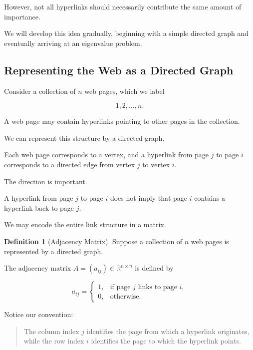 \documentclass[11pt,a4paper]{article}
\theoremstyle{definition}
\newtheorem{definition}[theorem]{Definition}
\theoremstyle{remark}
\begin{document}
However, not all hyperlinks
should necessarily contribute
the same amount of importance.

We will develop this idea
gradually, beginning with
a simple directed graph
and eventually arriving at
an eigenvalue problem.


\subsection{Representing the Web as a Directed Graph}

Consider a collection of
$n$ web pages, which we label

\[
1,2,\ldots,n.
\]

A web page may contain
hyperlinks pointing to
other pages in the collection.

We can represent this
structure by a directed graph.

Each web page corresponds
to a vertex, and a hyperlink
from page $j$ to page $i$
corresponds to a directed
edge from vertex $j$
to vertex $i$.

The direction is important.

A hyperlink from page $j$
to page $i$ does not imply
that page $i$ contains a
hyperlink back to page $j$.

We may encode the entire
link structure in a matrix.

\begin{definition}[Adjacency Matrix]

Suppose a collection of
$n$ web pages is represented
by a directed graph.

The adjacency matrix
$A=(a_{ij})\in\mathbb{R}^{n\times n}$
is defined by

\begin{equation}
a_{ij}
=
\begin{cases}
1, & \text{if page $j$ links to page $i$},\\
0, & \text{otherwise}.
\end{cases}
\label{eq:pagerank_adjacency}
\end{equation}

\end{definition}

Notice our convention:

\begin{quote}
The column index $j$
identifies the page from
which a hyperlink originates,
while the row index $i$
identifies the page to
which the hyperlink points.
\end{quote}
\end{document}
